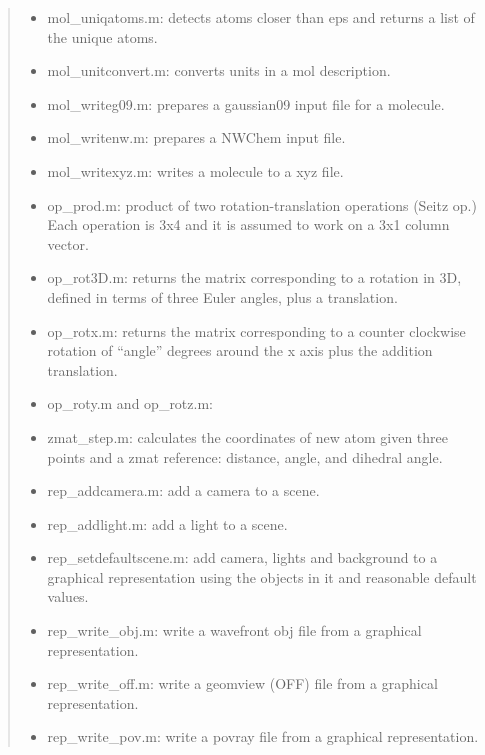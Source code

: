 \documentclass[a4paper]{article}
\begin{document}
\begin{quote}
\begin{itemize}
\item mol\_uniqatoms.m: detects atoms closer than eps and returns a list of
the unique atoms.

\item mol\_unitconvert.m: converts units in a mol description.

\item mol\_writeg09.m: prepares a gaussian09 input file for a molecule.

\item mol\_writenw.m: prepares a NWChem input file.

\item mol\_writexyz.m: writes a molecule to a xyz file.

\item op\_prod.m: product of two rotation-translation operations (Seitz op.)
Each operation is 3x4 and it is assumed to work on a 3x1 column
vector.

\item op\_rot3D.m: returns the matrix corresponding to a rotation in 3D,
defined in terms of three Euler angles, plus a translation.

\item op\_rotx.m: returns the matrix corresponding to a counter clockwise
rotation of ``angle'' degrees around the x axis plus the addition
translation.

\item op\_roty.m and op\_rotz.m:

\item zmat\_step.m: calculates the coordinates of new atom given three points
and a zmat reference: distance, angle, and dihedral angle.

\item rep\_addcamera.m: add a camera to a scene.

\item rep\_addlight.m: add a light to a scene.

\item rep\_setdefaultscene.m: add camera, lights and background to a
graphical representation using the objects in it and reasonable
default values.

\item rep\_write\_obj.m: write a wavefront obj file from a graphical
representation.

\item rep\_write\_off.m: write a geomview (OFF) file from a graphical
representation.

\item rep\_write\_pov.m: write a povray file from a graphical
representation.


\end{itemize}
\end{quote}
\end{document}
